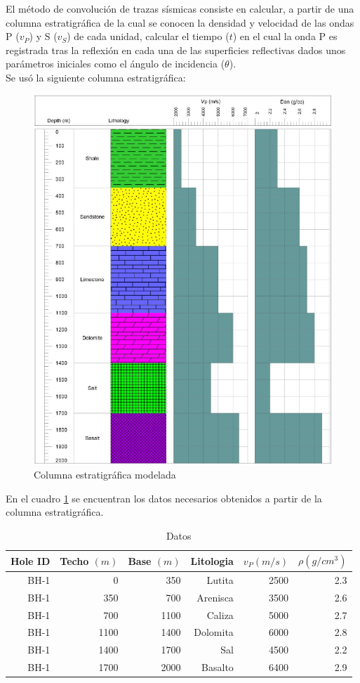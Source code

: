 \documentclass[%
 aip,
 jmp,%
 amsmath,amssymb,
 reprint,%
]{revtex4-1}
\begin{document}
El método de convolución de trazas sísmicas consiste en calcular, a partir de una columna estratigráfica de la cual se conocen la densidad y velocidad de las ondas P ($v_P$) y S ($v_S$) de cada unidad, calcular el tiempo ($t$) en el cual la onda P es registrada tras la reflexión en cada una de las superficies reflectivas dados unos parámetros iniciales como el ángulo de incidencia ($\theta$).\\
Se usó la siguiente columna estratigráfica:
\begin{figure}[h]
\centering
\caption{Columna estratigráfica modelada}

\label{fig:Columna}
\includegraphics[width=0.7\linewidth]{Columna}
\end{figure}

En el cuadro \ref{tab:datos} se encuentran los datos necesarios obtenidos a partir de la columna estratigráfica.
\begin{table}[h]
	\centering
	\caption{Datos}
	\begin{tabular}{r|r|r|r|r|r}
		Hole ID & Techo $(m)$ & Base $(m)$ & Litologia & $v_P (m/s)$ & $\rho (g/cm^3)$ \\ \hline
		BH-1  & 0     & 350   & Lutita & 2500  & 2.3 \\
		BH-1  & 350   & 700   & Arenisca & 3500  & 2.6 \\
		BH-1  & 700   & 1100  & Caliza & 5000  & 2.7 \\
		BH-1  & 1100  & 1400  & Dolomita & 6000  & 2.8 \\
		BH-1  & 1400  & 1700  & Sal   & 4500  & 2.2 \\
		BH-1  & 1700  & 2000  & Basalto & 6400  & 2.9 \\
	\end{tabular}%
	\label{tab:datos}%
\end{table}%
\end{document}
